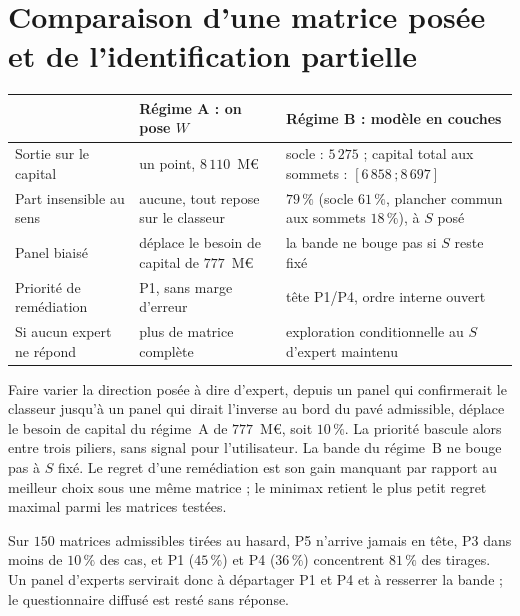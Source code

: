 
\section{Comparaison d'une matrice posée et de l'identification partielle}

\begin{center}\footnotesize
\renewcommand{\arraystretch}{1.3}
\begin{tabular}{@{}p{4.1cm} p{4.5cm} p{5.6cm}@{}}
\toprule
 & \textbf{Régime A : on pose $W$} & \textbf{Régime B : modèle en couches} \\
\midrule
Sortie sur le capital & un point, $8\,110$~M\euro{} & socle : $5\,275$ ; capital total aux sommets : $[6\,858\,;8\,697]$ \\
Part insensible au sens & aucune, tout repose sur le classeur & $79\,\%$ (socle $61\,\%$, plancher commun aux sommets $18\,\%$), à $S$ posé \\
Panel biaisé & déplace le besoin de capital de $777$~M\euro{} & la bande ne bouge pas si $S$ reste fixé \\
Priorité de remédiation & P1, sans marge d'erreur & tête P1/P4, ordre interne ouvert \\
Si aucun expert ne répond & plus de matrice complète & exploration conditionnelle au $S$ d'expert maintenu \\
\bottomrule
\end{tabular}
\end{center}

\vspace{2pt}
\noindent Faire varier la direction posée à dire d'expert, depuis un panel qui confirmerait le classeur
jusqu'à un panel qui dirait l'inverse au bord du pavé admissible, déplace le besoin de capital du
régime~A de $777$~M\euro{}, soit $10\,\%$. La priorité bascule alors entre trois piliers, sans signal
pour l'utilisateur. La bande du régime~B ne bouge pas à $S$ fixé. Le regret d'une remédiation est son gain manquant par rapport au meilleur choix sous une même matrice ; le minimax retient le plus petit regret maximal parmi les matrices testées.

Sur $150$ matrices admissibles tirées au hasard, P5 n'arrive jamais
en tête, P3 dans moins de $10\,\%$ des cas, et P1 ($45\,\%$) et P4 ($36\,\%$) concentrent $81\,\%$ des
tirages. Un panel d'experts servirait donc à départager
P1 et P4 et à resserrer la bande ; le questionnaire diffusé est resté sans réponse.


